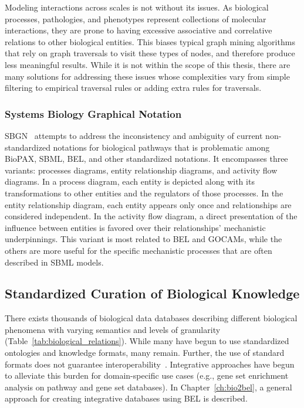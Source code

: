 Modeling interactions across scales is not without its issues.
As biological processes, pathologies, and phenotypes represent collections of molecular interactions, they are prone to having excessive associative and correlative relations to other biological entities.
This biases typical graph mining algorithms that rely on graph traversals to visit these types of nodes, and therefore produce less meaningful results.
While it is not within the scope of this thesis, there are many solutions for addressing these issues whose complexities vary from simple filtering to empirical traversal rules or adding extra rules for traversals.

\subsubsection{Systems Biology Graphical Notation}

\ac{SBGN}~\cite{LeNovere2009} attempts to address the inconsistency and ambiguity of current non-standardized notations for biological pathways that is problematic among \ac{BioPAX}, \ac{SBML}, \ac{BEL}, and other standardized notations.
It encompasses three variants: processes diagrams, entity relationship diagrams, and activity flow diagrams.
In a process diagram, each entity is depicted along with its transformations to other entities and the regulators of those processes.
In the entity relationship diagram, each entity appears only once and relationships are considered independent.
In the activity flow diagram, a direct presentation of the influence between entities is favored over their relationships' mechanistic underpinnings.
This variant is most related to \ac{BEL} and \acp{GOCAM}, while the others are more useful for the specific mechanistic processes that are often described in \ac{SBML} models.

\subsection{Standardized Curation of Biological Knowledge}
\label{subsec:standardized_curation}

There exists thousands of biological data databases describing different biological phenomena with varying semantics and levels of granularity (Table~\ref{tab:biological_relations}).
While many have begun to use standardized ontologies and knowledge formats, many remain.
Further, the use of standard formats does not guarantee interoperability~\cite{Domingo-Fernandez2019a}.
Integrative approaches have begun to alleviate this burden for domain-specific use cases (e.g., gene set enrichment analysis on pathway and gene set databases).
In Chapter~\ref{ch:bio2bel}, a general approach for creating integrative databases using BEL is described.

